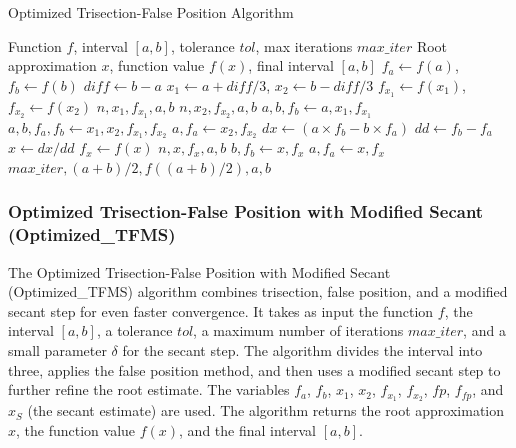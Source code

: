 \documentclass[11pt,a4paper]{article}
\begin{document}
\begin{algorithm}[H]
\caption{Optimized Trisection-False Position Algorithm}
\begin{algorithmic}[1]
\REQUIRE Function $f$, interval $[a,b]$, tolerance $tol$, max iterations $max\_iter$
\ENSURE Root approximation $x$, function value $f(x)$, final interval $[a,b]$
\STATE $f_a \leftarrow f(a)$, $f_b \leftarrow f(b)$
    \STATE $diff \leftarrow b - a$
    \STATE $x_1 \leftarrow a + diff/3$, $x_2 \leftarrow b - diff/3$
    \STATE $f_{x_1} \leftarrow f(x_1)$, $f_{x_2} \leftarrow f(x_2)$
        \RETURN $n, x_1, f_{x_1}, a, b$
    \ENDIF
        \RETURN $n, x_2, f_{x_2}, a, b$
    \ENDIF
        \STATE $a, b, f_b \leftarrow a, x_1, f_{x_1}$
        \STATE $a, b, f_a, f_b \leftarrow x_1, x_2, f_{x_1}, f_{x_2}$
    \ELSE
        \STATE $a, f_a \leftarrow x_2, f_{x_2}$
    \ENDIF
    \STATE $dx \leftarrow (a \times f_b - b \times f_a)$
    \STATE $dd \leftarrow f_b - f_a$
    \STATE $x \leftarrow dx / dd$
    \STATE $f_x \leftarrow f(x)$
        \RETURN $n, x, f_x, a, b$
    \ENDIF
        \STATE $b, f_b \leftarrow x, f_x$
    \ELSE
        \STATE $a, f_a \leftarrow x, f_x$
    \ENDIF
\ENDFOR
\RETURN $max\_iter, (a + b)/2, f((a + b)/2), a, b$
\end{algorithmic}
\end{algorithm}

\subsubsection{Optimized Trisection-False Position with Modified Secant (Optimized\_TFMS)}

The Optimized Trisection-False Position with Modified Secant (Optimized\_TFMS) algorithm combines trisection, false position, and a modified secant step for even faster convergence. It takes as input the function $f$, the interval $[a, b]$, a tolerance $tol$, a maximum number of iterations $max\_iter$, and a small parameter $\delta$ for the secant step. The algorithm divides the interval into three, applies the false position method, and then uses a modified secant step to further refine the root estimate. The variables $f_a$, $f_b$, $x_1$, $x_2$, $f_{x_1}$, $f_{x_2}$, $fp$, $f_{fp}$, and $x_S$ (the secant estimate) are used. The algorithm returns the root approximation $x$, the function value $f(x)$, and the final interval $[a, b]$.
\end{document}
